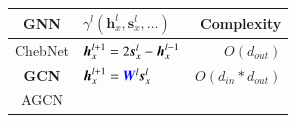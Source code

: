 \begin{table}[H]
    \centering
    \begin{footnotesize}
        \begin{tabular}{clr}
            \toprule
            GNN                                                                                                                                                                                                              &
            $\gamma^l(\boldsymbol{h}^l_x, \boldsymbol{s}^l_x, \dots)$                                                                                                                                                                                                         &
            Complexity                                                                                                                                                                                                         \\ \midrule
            ChebNet \cite{defferrad2016_chebnet}                                                                                                                                                                             &
            $\boldsymbol{h}_x^{l+1} = 2\boldsymbol{s}^{l}_{x} - \boldsymbol{h}_x^{l-1}$                                                                                                                                  &
            $O(d_{out})$                                                                                                                                                                                                       \\
            \textbf{GCN} \cite{kipf2017_gcn}                                                                                                                                                                                 &
            $\boldsymbol{h}_x^{l+1} = \textcolor{blue}{\boldsymbol{W}}^l  \boldsymbol{s}_x^{l}$                                                                                                                              &
            $O(d_{in} * d_{out})$                                                                                                                                                                                              \\
            AGCN   \cite{li2018_agcn}                                                                                                                                                                                        &

\end{tabular}
\end{footnotesize}
\end{table}
